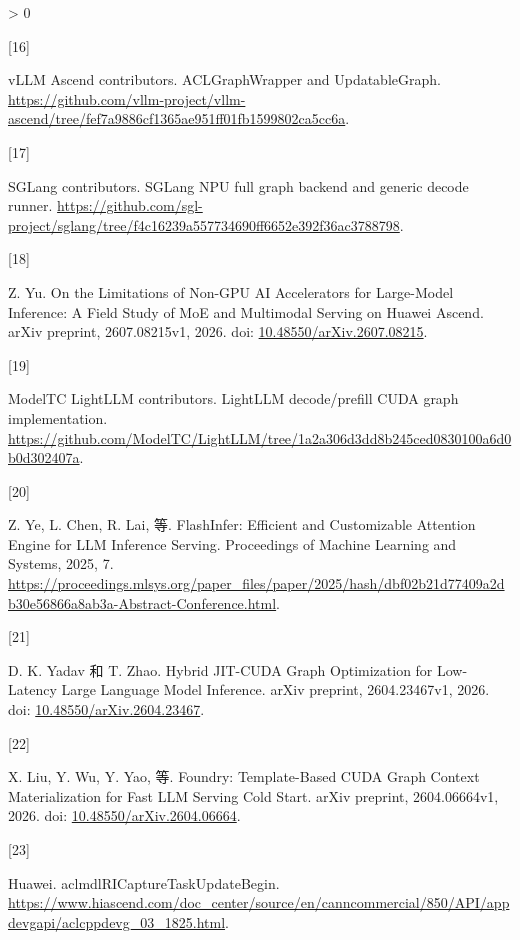 \documentclass[
  UTF8,
  zihao=5]{ctexart}
\newlength{\cslhangindent}
\newlength{\csllabelwidth}
\newenvironment{CSLReferences}[2] %
 {%
  \setlength{\parindent}{0pt}
  \ifodd #1 \everypar{\setlength{\hangindent}{\cslhangindent}}\ignorespaces\fi
  \ifnum #2 > 0
  \setlength{\parskip}{#2\baselineskip}
  \fi
 }%
 {}
\newcommand{\CSLLeftMargin}[1]{\parbox[t]{\csllabelwidth}{#1}}
\newcommand{\CSLRightInline}[1]{\parbox[t]{\linewidth - \csllabelwidth}{#1}\par}
\begin{document}
\begin{CSLReferences}{0}{0}
\leavevmode{}%
\CSLLeftMargin{{[}16{]} }%
\CSLRightInline{vLLM Ascend contributors. {ACLGraphWrapper and
UpdatableGraph}.
\url{https://github.com/vllm-project/vllm-ascend/tree/fef7a9886cf1365ae951ff01fb1599802ca5cc6a}.}

\leavevmode{}%
\CSLLeftMargin{{[}17{]} }%
\CSLRightInline{SGLang contributors. {SGLang NPU full graph backend and
generic decode runner}.
\url{https://github.com/sgl-project/sglang/tree/f4c16239a557734690ff6652e392f36ac3788798}.}

\leavevmode{}%
\CSLLeftMargin{{[}18{]} }%
\CSLRightInline{Z. Yu. {On the Limitations of Non-GPU AI Accelerators
for Large-Model Inference: A Field Study of MoE and Multimodal Serving
on Huawei Ascend}. arXiv preprint, 2607.08215v1, 2026. doi:
\href{https://doi.org/10.48550/arXiv.2607.08215}{10.48550/arXiv.2607.08215}.}

\leavevmode{}%
\CSLLeftMargin{{[}19{]} }%
\CSLRightInline{ModelTC LightLLM contributors. {LightLLM decode/prefill
CUDA graph implementation}.
\url{https://github.com/ModelTC/LightLLM/tree/1a2a306d3dd8b245ced0830100a6d0b0d302407a}.}

\leavevmode{}%
\CSLLeftMargin{{[}20{]} }%
\CSLRightInline{Z. Ye, L. Chen, R. Lai, 等. {FlashInfer: Efficient and
Customizable Attention Engine for LLM Inference Serving}. Proceedings of
Machine Learning and Systems, 2025, 7.
\url{https://proceedings.mlsys.org/paper_files/paper/2025/hash/dbf02b21d77409a2db30e56866a8ab3a-Abstract-Conference.html}.}

\leavevmode{}%
\CSLLeftMargin{{[}21{]} }%
\CSLRightInline{D. K. Yadav 和 T. Zhao. {Hybrid JIT-CUDA Graph
Optimization for Low-Latency Large Language Model Inference}. arXiv
preprint, 2604.23467v1, 2026. doi:
\href{https://doi.org/10.48550/arXiv.2604.23467}{10.48550/arXiv.2604.23467}.}

\leavevmode{}%
\CSLLeftMargin{{[}22{]} }%
\CSLRightInline{X. Liu, Y. Wu, Y. Yao, 等. Foundry: Template-Based CUDA
Graph Context Materialization for Fast LLM Serving Cold Start. arXiv
preprint, 2604.06664v1, 2026. doi:
\href{https://doi.org/10.48550/arXiv.2604.06664}{10.48550/arXiv.2604.06664}.}

\leavevmode{}%
\CSLLeftMargin{{[}23{]} }%
\CSLRightInline{Huawei. {aclmdlRICaptureTaskUpdateBegin}.
\url{https://www.hiascend.com/doc_center/source/en/canncommercial/850/API/appdevgapi/aclcppdevg_03_1825.html}.}


\end{CSLReferences}
\end{document}
